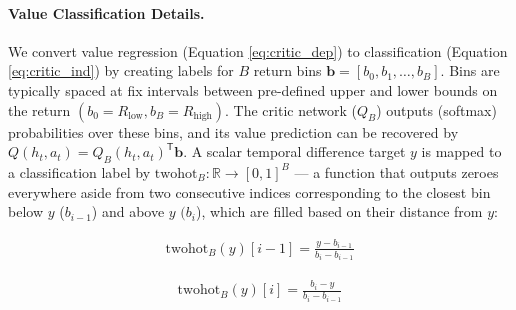 \paragraph{Value Classification Details.} We convert value regression (Equation \ref{eq:critic_dep}) to classification (Equation \ref{eq:critic_ind}) by creating labels for $B$ return bins $\mathbf{b} = [b_0, b_1, \dots, b_B]$. Bins are typically spaced at fix intervals between pre-defined upper and lower bounds on the return $(b_0 = R_\text{low}, b_B = R_\text{high})$. The critic network ($Q_B$) outputs (softmax) probabilities over these bins, and its value prediction can be recovered by $Q(h_t, a_t) = Q_B(h_t, a_t)^\mathsf{T}\mathbf{b} $.  A scalar temporal difference target $y$ is mapped to a classification label by $\text{twohot}_B: \mathbb{R} \rightarrow [0, 1]^{B}$ --- a function that outputs zeroes everywhere aside from two consecutive indices corresponding to the closest bin below $y$ ($b_{i-1}$) and above $y$ $(b_{i}$), which are filled based on their distance from $y$:

\begin{minipage}{0.45\textwidth}
  \begin{align}
    \text{twohot}_B(y)[i-1] = \frac{y - b_{i-1}}{b_i - b_{i-1}}
    \end{align}
\end{minipage}
\begin{minipage}{0.45\textwidth}
    \begin{align}
    \text{twohot}_B(y)[i] = \frac{b_{i} - y}{b_i - b_{i-1}}
    \end{align}
\end{minipage}


